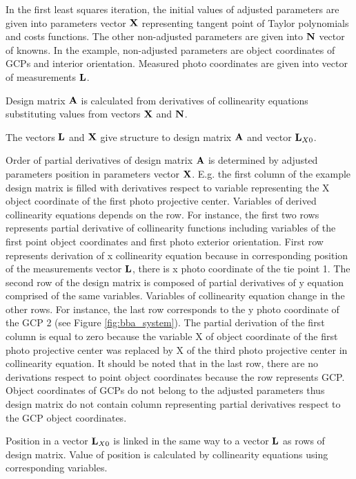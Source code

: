 \documentclass[a4paper,12pt]{article}
\newcommand{\evect}[1]{%
{\bf #1}%
}
\begin{document}
In the first least squares iteration, the initial values of adjusted parameters are given into parameters vector $\evect{X}$
 representing tangent point of Taylor polynomials and costs functions.  The other non-adjusted 
parameters are given into $\evect{N}$ vector of knowns. In the example, non-adjusted parameters are object coordinates
of GCPs and interior orientation. 
Measured photo coordinates are given
into vector of measurements $\evect{L}$.

Design matrix $\evect{A}$ is calculated from 
derivatives of collinearity equations substituting values from vectors $\evect{X}$ and $\evect{N}$.


The vectors  $\evect{L}$ and  $\evect{X}$ give structure to design matrix $\evect{A}$ and
vector $\evect{L}_{X0}$.

Order of partial derivatives of design matrix $\evect{A}$  is determined by adjusted parameters position in 
parameters vector $\evect{X}$. E.g. the first column of the example design matrix is filled with derivatives respect 
to variable representing the  X object coordinate of the first photo projective center. Variables of derived collinearity equations
depends on the row. For instance, the first two rows represents partial derivative of collinearity functions 
including variables of the first point object coordinates  and first photo exterior orientation.  First row represents  
derivation of x collinearity equation because in corresponding position of the measurements vector $\evect{L}$, there is 
x photo coordinate of the tie point 1. The second row of the design matrix is composed of 
partial derivatives of y equation comprised of the same variables. 
Variables of collinearity equation change in the other rows. For instance, the last row corresponds to the 
y photo coordinate of the GCP 2 (see Figure \ref{fig:bba_system}). The partial derivation of the first column is equal 
to zero because the variable X of object coordinate of the first photo projective center was replaced 
by X of the third photo projective center in collinearity equation. 
It should be noted that in the last row, there are no derivations 
respect to point object coordinates because the row represents GCP. Object coordinates of GCPs do not 
belong to the adjusted parameters thus design matrix do not contain column representing partial 
derivatives respect to the GCP object coordinates.


Position in a vector $\evect{L}_{X0}$ is linked in the same way to a vector $\evect{L}$ as rows of design matrix.
Value of position is calculated by collinearity equations using corresponding variables.
\end{document}
